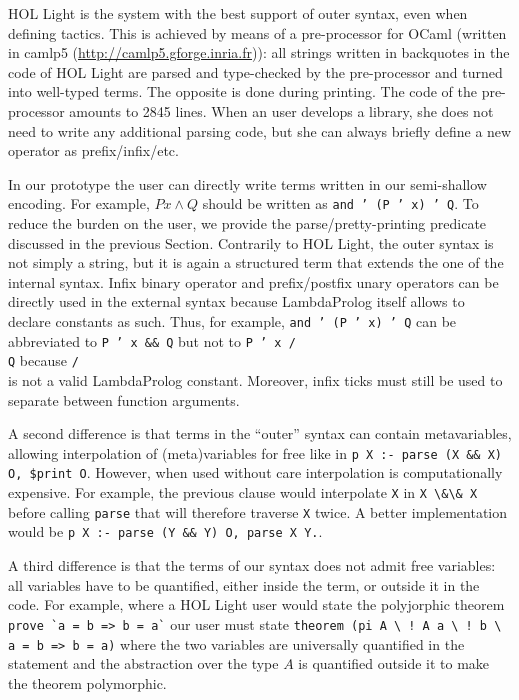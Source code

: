 \documentclass[preprint]{sigplanconf}
\begin{document}
HOL Light is the system with the best support of outer syntax, even when defining tactics. This is achieved by means of a pre-processor for OCaml (written in camlp5 (\url{http://camlp5.gforge.inria.fr})): all strings written in backquotes in the code of HOL Light are parsed and type-checked by the pre-processor and turned into well-typed terms. The opposite is done during printing. The code of the pre-processor amounts to 2845 lines. When an user develops a library, she does not need to write any additional parsing code, but she can always briefly define a new operator as prefix/infix/etc.

In our prototype the user can directly write terms written in our semi-shallow encoding. For example, $P x \wedge Q$ should be written as \texttt{and ' (P ' x) ' Q}. To reduce the burden on the user, we provide the parse/pretty-printing predicate discussed in the previous Section. Contrarily to HOL Light, the outer syntax is not simply a string, but it is again a structured term that extends the one of the internal syntax. Infix binary operator and prefix/postfix unary operators can be directly used in the external syntax because LambdaProlog itself allows to declare constants as such. Thus, for example, \texttt{and ' (P ' x) ' Q} can be abbreviated to \texttt{P ' x \&\& Q} but not to \texttt{P ' x /\\ Q} because \texttt{/\\} is not a valid LambdaProlog constant. Moreover, infix ticks must still be used to separate between function arguments.

A second difference  is that terms in the ``outer'' syntax can contain metavariables, allowing interpolation of (meta)variables for free like in \texttt{p X :- parse (X \&\& X) O, \$print O}. However, when used without care interpolation is computationally expensive. For example, the previous clause would interpolate \verb+X+ in \verb+X \&\& X+ before calling \verb+parse+ that will therefore traverse \verb+X+ twice. A better implementation would be \texttt{p X :- parse (Y \&\& Y) O, parse X Y.}.

A third difference is that the terms of our syntax does not admit free variables: all variables have to be quantified, either inside the term, or outside it in the code. For example, where a HOL Light user would state the polyjorphic theorem \verb+ prove `a = b => b = a`+ our user must state \verb+theorem (pi A \ ! A a \ ! b \ a = b => b = a)+ where the two variables are universally quantified in the statement and the abstraction over the type $A$ is quantified outside it to make the theorem polymorphic.
\end{document}
